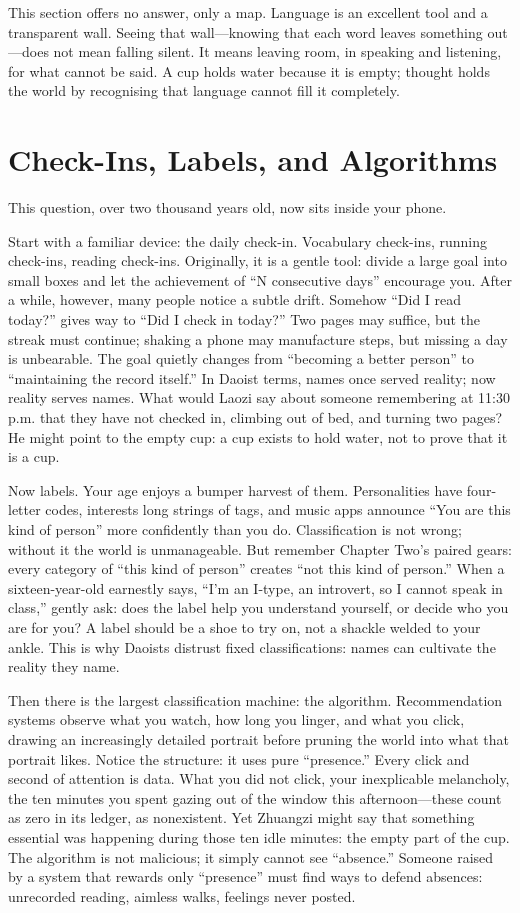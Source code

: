 This section offers no answer, only a map. Language is an excellent tool and a transparent wall. Seeing that wall---knowing that each word leaves something out---does not mean falling silent. It means leaving room, in speaking and listening, for what cannot be said. A cup holds water because it is empty; thought holds the world by recognising that language cannot fill it completely.

\section{Check-Ins, Labels, and Algorithms}
This question, over two thousand years old, now sits inside your phone.

Start with a familiar device: the daily check-in. Vocabulary check-ins, running check-ins, reading check-ins. Originally, it is a gentle tool: divide a large goal into small boxes and let the achievement of ``N consecutive days'' encourage you. After a while, however, many people notice a subtle drift. Somehow ``Did I read today?'' gives way to ``Did I check in today?'' Two pages may suffice, but the streak must continue; shaking a phone may manufacture steps, but missing a day is unbearable. The goal quietly changes from ``becoming a better person'' to ``maintaining the record itself.'' In Daoist terms, names once served reality; now reality serves names. What would Laozi say about someone remembering at 11:30 p.m. that they have not checked in, climbing out of bed, and turning two pages? He might point to the empty cup: a cup exists to hold water, not to prove that it is a cup.

Now labels. Your age enjoys a bumper harvest of them. Personalities have four-letter codes, interests long strings of tags, and music apps announce ``You are this kind of person'' more confidently than you do. Classification is not wrong; without it the world is unmanageable. But remember Chapter Two's paired gears: every category of ``this kind of person'' creates ``not this kind of person.'' When a sixteen-year-old earnestly says, ``I'm an I-type, an introvert, so I cannot speak in class,'' gently ask: does the label help you understand yourself, or decide who you are for you? A label should be a shoe to try on, not a shackle welded to your ankle. This is why Daoists distrust fixed classifications: names can cultivate the reality they name.

Then there is the largest classification machine: the algorithm. Recommendation systems observe what you watch, how long you linger, and what you click, drawing an increasingly detailed portrait before pruning the world into what that portrait likes. Notice the structure: it uses pure ``presence.'' Every click and second of attention is data. What you did not click, your inexplicable melancholy, the ten minutes you spent gazing out of the window this afternoon---these count as zero in its ledger, as nonexistent. Yet Zhuangzi might say that something essential was happening during those ten idle minutes: the empty part of the cup. The algorithm is not malicious; it simply cannot see ``absence.'' Someone raised by a system that rewards only ``presence'' must find ways to defend absences: unrecorded reading, aimless walks, feelings never posted.

